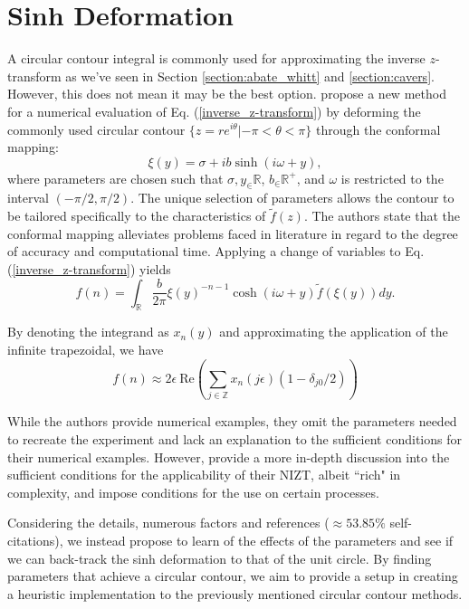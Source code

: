 \documentclass[a4paper]{report}
\begin{document}
\section{Sinh Deformation}\label{section:sinh_deformation}
A circular contour integral is commonly used for approximating the inverse $z$-transform as we've seen in Section \ref{section:abate_whitt} and \ref{section:cavers}. However, this does not mean it may be the best option. \citet{levendorskii2022sinh} propose a new method for a numerical evaluation of Eq. (\ref{inverse_z-transform}) by deforming the commonly used circular contour $\{z = re^{i\theta} | -\pi < \theta < \pi\}$ through the conformal mapping:
\begin{equation}\label{equation:conformal_mapping}
    \xi(y) = \sigma + ib\sinh(i\omega + y),
\end{equation}
where parameters are chosen such that $\sigma,y_\in \mathbb{R}$, $b_\in \mathbb{R}^+$, and $\omega$ is restricted to the interval $(-\pi/2, \pi / 2)$. The unique selection of parameters allows the contour to be tailored specifically to the characteristics of $\tilde{f}(z)$. The authors state that the conformal mapping alleviates problems faced in literature \citep{boyarchenko2014efficient, boyarchenko2019sinh, schmelzer2007computing} in regard to the degree of accuracy and computational time. Applying a change of variables to Eq. (\ref{inverse_z-transform}) yields
\begin{equation}
    f(n) = \int_\mathbb{R} \frac{b}{2\pi} \xi(y)^{-n-1} \cosh(i\omega + y) \tilde{f}(\xi(y)) dy.
\end{equation}

By denoting the integrand as $x_n(y)$ and approximating the application of the infinite trapezoidal, we have 
\begin{equation}
    f(n) \approx 2 \epsilon\ \text{Re}\left( \sum_{j \in \mathbb{Z}} x_n(j \epsilon)(1 - \delta_{j0}/2) \right)
\end{equation}

While the authors provide numerical examples, they omit the parameters needed to recreate the experiment and lack an explanation to the sufficient conditions for their numerical examples. However, \citet{levendorskii2023conditions} provide a more in-depth discussion into the sufficient conditions for the applicability of their NIZT, albeit ``rich" in complexity, and impose conditions for the use on certain processes. 

Considering the details, numerous factors and references ($\approx53.85\%$ self-citations), we instead propose to learn of the effects of the parameters and see if we can back-track the sinh deformation to that of the unit circle. By finding parameters that achieve a circular contour, we aim to provide a setup in creating a heuristic implementation to the previously mentioned circular contour methods.
\end{document}
